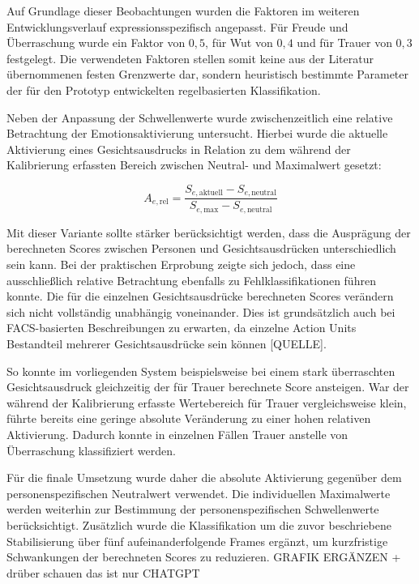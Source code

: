 \documentclass[intern]{cgMA}
\begin{document}
Auf Grundlage dieser Beobachtungen wurden die Faktoren im weiteren
Entwicklungsverlauf expressionsspezifisch angepasst. Für Freude und
Überraschung wurde ein Faktor von $0{,}5$, für Wut von $0{,}4$ und
für Trauer von $0{,}3$ festgelegt. Die verwendeten Faktoren stellen
somit keine aus der Literatur übernommenen festen Grenzwerte dar,
sondern heuristisch bestimmte Parameter der für den Prototyp
entwickelten regelbasierten Klassifikation.

Neben der Anpassung der Schwellenwerte wurde zwischenzeitlich eine
relative Betrachtung der Emotionsaktivierung untersucht. Hierbei wurde
die aktuelle Aktivierung eines Gesichtsausdrucks in Relation zu dem
während der Kalibrierung erfassten Bereich zwischen Neutral- und
Maximalwert gesetzt:

\begin{equation}
    A_{e,\text{rel}} =
    \frac{
        S_{e,\text{aktuell}} -
        S_{e,\text{neutral}}
    }{
        S_{e,\text{max}} -
        S_{e,\text{neutral}}
    }
\end{equation}

Mit dieser Variante sollte stärker berücksichtigt werden, dass die
Ausprägung der berechneten Scores zwischen Personen und
Gesichtsausdrücken unterschiedlich sein kann. Bei der praktischen
Erprobung zeigte sich jedoch, dass eine ausschließlich relative
Betrachtung ebenfalls zu Fehlklassifikationen führen konnte. Die für
die einzelnen Gesichtsausdrücke berechneten Scores verändern sich
nicht vollständig unabhängig voneinander. Dies ist grundsätzlich auch
bei FACS-basierten Beschreibungen zu erwarten, da einzelne Action Units
Bestandteil mehrerer Gesichtsausdrücke sein können [QUELLE].

So konnte im vorliegenden System beispielsweise bei einem stark
überraschten Gesichtsausdruck gleichzeitig der für Trauer berechnete
Score ansteigen. War der während der Kalibrierung erfasste Wertebereich
für Trauer vergleichsweise klein, führte bereits eine geringe absolute
Veränderung zu einer hohen relativen Aktivierung. Dadurch konnte in
einzelnen Fällen Trauer anstelle von Überraschung klassifiziert werden.

Für die finale Umsetzung wurde daher die absolute Aktivierung gegenüber
dem personenspezifischen Neutralwert verwendet. Die individuellen
Maximalwerte werden weiterhin zur Bestimmung der personenspezifischen
Schwellenwerte berücksichtigt. Zusätzlich wurde die Klassifikation um
die zuvor beschriebene Stabilisierung über fünf aufeinanderfolgende
Frames ergänzt, um kurzfristige Schwankungen der berechneten Scores
zu reduzieren.
GRAFIK ERGÄNZEN + drüber schauen das ist nur CHATGPT
\end{document}
